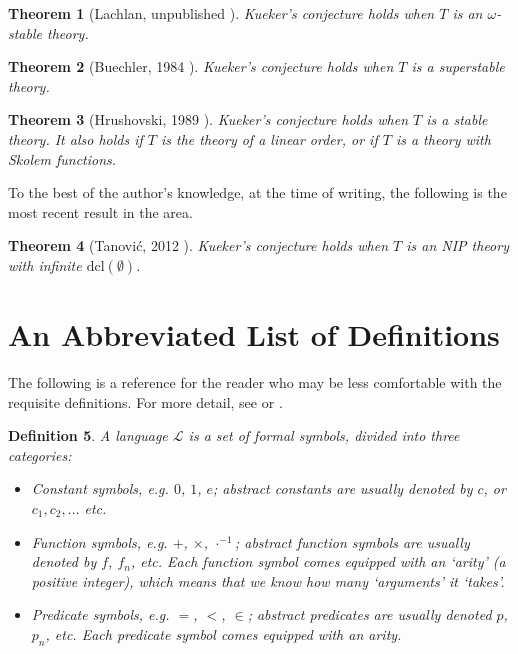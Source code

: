 \documentclass{article}
\newtheorem{theorem}{Theorem}[section]
\newtheorem{definition}[theorem]{Definition}
\theoremstyle{nonumberplain}
\newcommand{\Lang}{\mathcal{L}}
\begin{document}
\begin{theorem}[Lachlan, unpublished \cite{kuekersuperstable}]
Kueker's conjecture holds when $T$ is an $\omega$-stable theory.
\end{theorem}

\begin{theorem}[Buechler, 1984 \cite{kuekersuperstable}]
Kueker's conjecture holds when $T$ is a superstable theory.
\end{theorem}

\begin{theorem}[Hrushovski, 1989 \cite{hrushovski_kueker}]
Kueker's conjecture holds when $T$ is a stable theory. It also holds if $T$ is the theory of a linear order, or if $T$ is a theory with Skolem functions.
\end{theorem}

To the best of the author's knowledge, at the time of writing, the following is the most recent result in the area.

\begin{theorem}[Tanović, 2012 \cite{tanovic_kueker}]
Kueker's conjecture holds when $T$ is an NIP theory with infinite $\mathrm{dcl}(\emptyset)$.
\end{theorem}


\pagebreak


\appendix

\section{An Abbreviated List of Definitions}\label{appendix:1}

The following is a reference for the reader who may be less comfortable with the requisite definitions. For more detail, see \cite{cnk} or \cite{shoenfield}.

\begin{definition}
A \emph{language} $\Lang$ is a set of formal symbols, divided into three categories:
\begin{itemize}
\item Constant symbols, e.g. $0$, $1$, $e$; abstract constants are usually denoted by $c$, or $c_1, c_2, \dots$ etc.
\item Function symbols, e.g. $+$, $\times$, $\cdot^{-1}$; abstract function symbols are usually denoted by $f$, $f_n$, etc. Each function symbol comes equipped with an `arity' (a positive integer), which means that we know how many `arguments' it `takes'.
\item Predicate symbols, e.g. $=$, $<$, $\in$; abstract predicates are usually denoted $p$, $p_n$, etc. Each predicate symbol comes equipped with an arity.
\end{itemize}
\end{definition}
\end{document}
